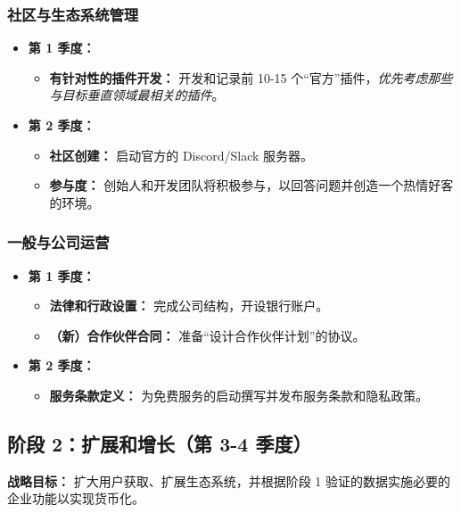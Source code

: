 \documentclass[11pt, a4paper, oneside]{article}
\begin{document}
\subsubsection*{社区与生态系统管理}
\begin{itemize}[leftmargin=*]
    \item \textbf{第 1 季度：}
    \begin{itemize}
        \item \textbf{有针对性的插件开发：} 开发和记录前 10-15 个“官方”插件，\textit{优先考虑那些与目标垂直领域最相关的插件}。
    \end{itemize}
    \item \textbf{第 2 季度：}
    \begin{itemize}
        \item \textbf{社区创建：} 启动官方的 Discord/Slack 服务器。
        \item \textbf{参与度：} 创始人和开发团队将积极参与，以回答问题并创造一个热情好客的环境。
    \end{itemize}
\end{itemize}

\subsubsection*{一般与公司运营}
\begin{itemize}[leftmargin=*]
    \item \textbf{第 1 季度：}
    \begin{itemize}
        \item \textbf{法律和行政设置：} 完成公司结构，开设银行账户。
        \item \textbf{（新）合作伙伴合同：} 准备“设计合作伙伴计划”的协议。
    \end{itemize}
    \item \textbf{第 2 季度：}
    \begin{itemize}
        \item \textbf{服务条款定义：} 为免费服务的启动撰写并发布服务条款和隐私政策。
    \end{itemize}
\end{itemize}

\subsection{阶段 2：扩展和增长（第 3-4 季度）}
\textbf{战略目标：} 扩大用户获取、扩展生态系统，并根据阶段 1 验证的数据实施必要的企业功能以实现货币化。
\end{document}
